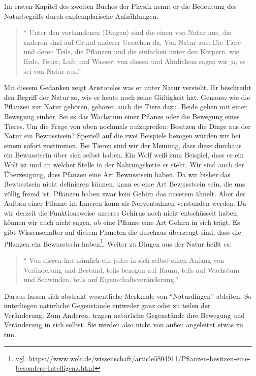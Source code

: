 Im ersten Kapitel des zweiten Buches der Physik nennt er die Bedeutung des Naturbegriffs durch explemplarische Aufzählungen. 
\begin{quote}
	\enquote{ Unter den vorhandenen (Dingen) sind die einen von Natur aus, die anderen sind auf Grund anderer Ursachen da. Von
Natur aus: Die Tiere und deren Teile, die Pflanzen und die einfachen unter den Körpern, wie Erde, Feuer, Luft und
Wasser; von diesen und Ähnlichem sagen wir ja, es sei von Natur aus.}
	\cite[192b8 ff.]{PhysikII} 
\end{quote}
Mit diesem Gedanken zeigt Aristoteles was er unter Natur versteht. Er beschreibt den Begriff der Natur so, wie er heute noch seine Gültigkeit hat. Genauso wie die Pflanzen zur Natur gehören, gehören auch die Tiere dazu. Beide gehen mit einer Bewegung einher. Sei es das Wachstum einer Pflanze oder die Bewegung eines Tieres. Um die Frage von oben nochmals aufzugreifen: Besitzen die Dinge aus der Natur ein Bewusstsein? Speziell auf die zwei Beispiele bezogen würden wir bei einem sofort zustimmen. Bei Tieren sind wir der Meinung, dass diese durchaus ein Bewusstsein über sich selbst haben. Ein Wolf weiß zum Beispiel, dass er ein Wolf ist und an welcher Stelle in der Nahrungskette er steht. Wir sind auch der Überzeugung, dass Pfanzen eine Art Bewusstsein haben. Da wir bisher das Bewusstsein nicht definieren können, kann es eine Art Bewusstsein sein, die uns völlig fremd ist. Pflanzen haben zwar kein Gehirn das unserem ähnelt. Aber der Aufbau einer Pflanze im Inneren kann als Nervenbahnen verstanden werden. Da wir derzeit die Funktionsweise unseres Gehirns noch nicht entschüsselt haben, können wir auch nicht sagen, ob eine Pflanze eine Art Gehirn in sich trägt. Es gibt Wissenschafter auf diesem Planeten die durchaus überzeugt sind, dass die Pflanzen ein Bewusstsein haben\footnote{ vgl. \url{https://www.welt.de/wissenschaft/article5804911/Pflanzen-besitzen-eine-besondere-Intelligenz.html}}.    
Weiter zu Dingen aus der Natur heißt es:
\begin{quote}
	\enquote{ Von diesen hat nämlich ein jedes in sich selbst einen Anfang von Veränderung und Bestand, teils bezogen auf Raum, teils auf Wachstum und Schwinden, teils auf Eigenschaftsveränderung.}
	\cite[192b8 ff.]{PhysikII} 
\end{quote}
Daraus lassen sich abstrakt wesentliche Merkmale von \enquote{Naturdingen} ableiten. So unterliegen natürliche Gegenstände entweder ganz oder zu teilen der Veränderung. Zum Anderen, tragen natürliche Gegenstände ihre Bewegung und Veränderung in sich selbst. Sie werden also nicht von außen angeleitet etwas zu tun.

